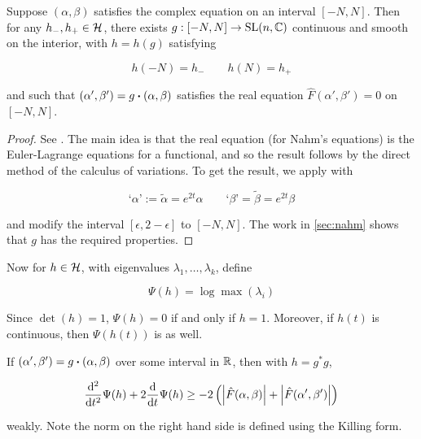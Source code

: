 \documentclass{article}
\begin{document}
\begin{lemma}
    \label{lem:gauge-exists-with-dirichlet}
    Suppose \((\alpha, \beta)\) satisfies the complex equation on an interval \([-N, N]\). Then for any \(h_-, h_+ \in \mathcal{H}\), there exists \(g : [-N, N] \to \operatorname{SL}(n, \mathbb{C})\) continuous and smooth on the interior, with \(h = h(g)\) satisfying

    \[h(-N) = h_- \qquad h(N) = h_+\]

    and such that \((\alpha', \beta') = g \vdot (\alpha, \beta)\) satisfies the real equation \(\hat F(\alpha', \beta') = 0\) on \([-N, N]\).
\end{lemma}

\begin{proof}
    See \cite[Proposition 2.8]{donaldson_nahms_1984}. The main idea is that the real equation (for Nahm's equations) is the Euler-Lagrange equations for a functional, and so the result follows by the direct method of the calculus of variations. To get the result, we apply \cite[Proposition 2.8]{donaldson_nahms_1984} with

    \[\text{`}\alpha\text{'} := \tilde \alpha = e^{2t}\alpha \qquad \text{`}\beta\text{'} = \tilde\beta = e^{2t}\beta\]

    and modify the interval \([\epsilon, 2-\epsilon]\) to \([-N, N]\). The work in \cref{sec:nahm} shows that \(g\) has the required properties.
\end{proof}

Now for \(h \in \mathcal{H}\), with eigenvalues \(\lambda_1, \dots, \lambda_k\), define

\[\Psi(h) = \log\max(\lambda_i)\]

Since \(\det(h) = 1\), \(\Psi(h) = 0\) if and only if \(h = 1\). Moreover, if \(h(t)\) is continuous, then \(\Psi(h(t))\) is as well.

\begin{lemma}
    \label{lem:differential-inequality}

    If \((\alpha', \beta') = g \vdot (\alpha, \beta)\) over some interval in \(\mathbb{R}\), then with \(h = g^*g\),

    \[\dv[2]{t}\Psi(h) + 2\dv{t}\Psi(h) \ge -2\left(\abs{\hat F(\alpha, \beta)} + \abs{\hat F(\alpha', \beta')}\right)\]

    weakly. Note the norm on the right hand side is defined using the Killing form.
\end{lemma}
\end{document}
